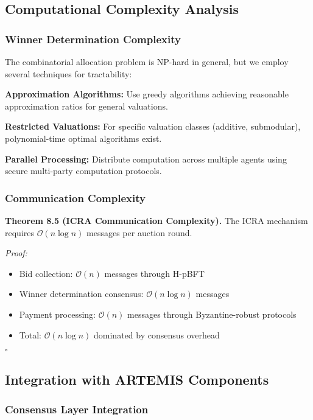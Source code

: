 \documentclass[conference]{IEEEtran}
\newcommand{\bigO}{\mathcal{O}}
\begin{document}
\subsection{Computational Complexity Analysis}

\subsubsection{Winner Determination Complexity}

The combinatorial allocation problem is NP-hard in general, but we employ several techniques for tractability:

\textbf{Approximation Algorithms:} Use greedy algorithms achieving reasonable approximation ratios for general valuations.

\textbf{Restricted Valuations:} For specific valuation classes (additive, submodular), polynomial-time optimal algorithms exist.

\textbf{Parallel Processing:} Distribute computation across multiple agents using secure multi-party computation protocols.

\subsubsection{Communication Complexity}

\textbf{Theorem 8.5 (ICRA Communication Complexity).} The ICRA mechanism requires $\bigO(n \log n)$ messages per auction round.

\textit{Proof:}
\begin{itemize}
    \item Bid collection: $\bigO(n)$ messages through H-pBFT
    \item Winner determination consensus: $\bigO(n \log n)$ messages
    \item Payment processing: $\bigO(n)$ messages through Byzantine-robust protocols
    \item Total: $\bigO(n \log n)$ dominated by consensus overhead
\end{itemize}
$\square$

\subsection{Integration with ARTEMIS Components}

\subsubsection{Consensus Layer Integration}
\end{document}
